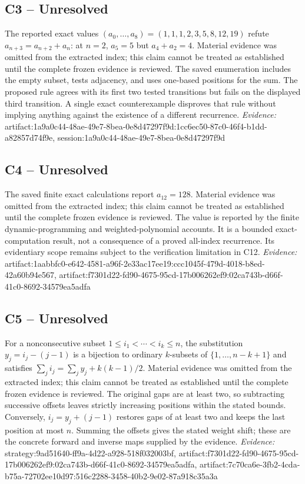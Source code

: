 \documentclass[11pt]{article}
\begin{document}
\subsection{C3 -- Unresolved}
The reported exact values $(a_0,\ldots,a_8)=(1,1,1,2,3,5,8,12,19)$ refute $a_{n+3}=a_{n+2}+a_n$: at $n=2$, $a_5=5$ but $a_4+a_2=4$.
Material evidence was omitted from the extracted index; this claim cannot be treated as established until the complete frozen evidence is reviewed. The saved enumeration includes the empty subset, tests adjacency, and uses one-based positions for the sum. The proposed rule agrees with its first two tested transitions but fails on the displayed third transition. A single exact counterexample disproves that rule without implying anything against the existence of a different recurrence.
\textit{Evidence: }artifact:1a9a0c44-48ae-49e7-8bea-0e8d47297f9d:1cc6ec50-87c0-46f4-b1dd-a82857d74f9e, session:1a9a0c44-48ae-49e7-8bea-0e8d47297f9d
\subsection{C4 -- Unresolved}
The saved finite exact calculations report $a_{12}=128$.
Material evidence was omitted from the extracted index; this claim cannot be treated as established until the complete frozen evidence is reviewed. The value is reported by the finite dynamic-programming and weighted-polynomial accounts. It is a bounded exact-computation result, not a consequence of a proved all-index recurrence. Its evidentiary scope remains subject to the verification limitation in C12.
\textit{Evidence: }artifact:1aabbfc0-e642-4581-a96f-2e33ac17ee19:ccc1045f-479d-4018-b8ed-42a60b94e567, artifact:f7301d22-fd90-4675-95cd-17b006262ef9:02ca743b-d66f-41c0-8692-34579ea5adfa
\subsection{C5 -- Unresolved}
For a nonconsecutive subset $1\leq i_1<\cdots<i_k\leq n$, the substitution $y_j=i_j-(j-1)$ is a bijection to ordinary $k$-subsets of $\{1,\ldots,n-k+1\}$ and satisfies $\sum_j i_j=\sum_j y_j+k(k-1)/2$.
Material evidence was omitted from the extracted index; this claim cannot be treated as established until the complete frozen evidence is reviewed. The original gaps are at least two, so subtracting successive offsets leaves strictly increasing positions within the stated bounds. Conversely, $i_j=y_j+(j-1)$ restores gaps of at least two and keeps the last position at most $n$. Summing the offsets gives the stated weight shift; these are the concrete forward and inverse maps supplied by the evidence.
\textit{Evidence: }strategy:9ad51640-ff9a-4d22-a928-518f032003bf, artifact:f7301d22-fd90-4675-95cd-17b006262ef9:02ca743b-d66f-41c0-8692-34579ea5adfa, artifact:7c70ca6e-3fb2-4cda-b75a-72702ee10d97:516c2288-3458-40b2-9e02-87a918c35a3a
\end{document}
